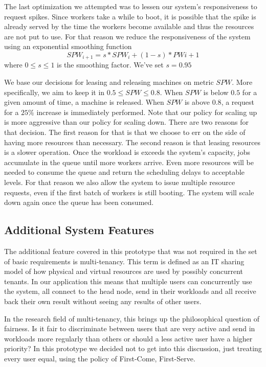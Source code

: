 \documentclass{stylesheet}
\begin{document}
The last optimization we attempted was to lessen our system's responsiveness to request spikes. Since workers take a while to boot, it is possible that the spike is already served by the time the workers become available and thus the resources are not put to use. For that reason we reduce the responsiveness of the system using an exponential smoothing function
$$SPW_{i+1} = s*SPW_{i} + (1-s)*PW{i+1}$$ where $0 \leq s \leq 1$ is the smoothing factor. We've set $s=0.95$

We base our decisions for leasing and releasing machines on metric $SPW$. More specifically, we aim to keep it in $0.5 \leq SPW \leq 0.8$. When $SPW$ is below $0.5$ for a given amount of time, a machine is released. When $SPW$ is above $0.8$, a request for a $25\%$ increase is immediately performed. Note that our policy for scaling up is more aggressive than our policy for scaling down. There are two reasons for that decision. The first reason for that is that we choose to err on the side of having more resources than necessary. The second reason is that leasing resources is a slower operation. Once the workload is exceeds the system's capacity, jobs accumulate in the queue until more workers arrive. Even more resources will be needed to consume the queue and return the scheduling delays to acceptable levels. For that reason we also allow the system to issue multiple resource requests, even if the first batch of workers is still booting. The system will scale down again once the queue has been consumed.

\subsection{Additional System Features}
\label{subsec:additionalFeatures}
The additional feature covered in this prototype that was not required in the set of basic requirements is multi-tenancy. This term is defined as an IT sharing model of how physical and virtual resources are used by possibly concurrent tenants. In our application this means that multiple users can concurrently use the system, all connect to the head node, send in their workloads and all receive back their own result without seeing any results of other users.

In the research field of multi-tenancy, this brings up the philosophical question of fairness. Is it fair to discriminate between users that are very active and send in workloads more regularly than others or should a less active user have a higher priority? In this prototype we decided not to get into this discussion, just treating every user equal, using the policy of First-Come, First-Serve.
\end{document}
